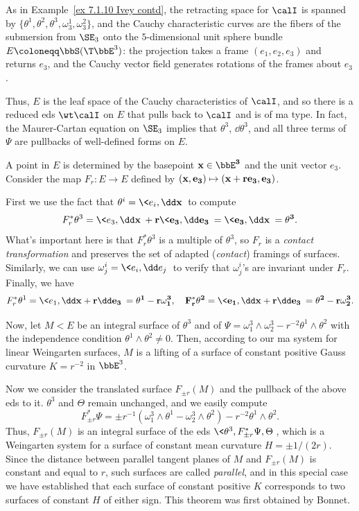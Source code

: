As in Example~\ref{ex 7.1.10 Ivey contd}, the retracting space for $\calI$ is spanned by $\{\theta^1,\theta^2,\theta^3,\omega_3^1,\omega_3^2\}$, and the Cauchy characteristic curves are the fibers of the submersion from $\SE_3$ onto the $5$-dimensional unit sphere bundle $E\coloneqq \bbS(\T\bbE^3)$: the projection takes a frame $(e_1,e_2,e_3)$ and returns $e_3$, and the Cauchy vector field generates rotations of the frames about $e_3$.

Thus, $E$ is the leaf space of the Cauchy characteristics of $\calI$, and so there is a reduced \gls{eds} $\wt\calI$ on $E$ that pulls back to $\calI$ and is of \gls{ma} type. In fact, the Maurer-Cartan equation on $\SE_3$ implies that $\theta^3$, $\dd\theta^3$, and all three terms of $\Psi$ are pullbacks of well-defined forms on $E$.

\begin{example}\label{xca 7.4.15 Ivey}
    A point in $E$ is determined by the basepoint $\bf{x}\in\bbE^3$ and the unit vector $e_3$. Consider the map $F_r:E\to E$ defined by $(\bf{x},e_3)\mapsto (\bf{x}+re_3,e_3)$.

    First we use the fact that $\theta^i=\<e_i,\dd \bf{x}\>$ to compute 
    \[F_r^\ast\theta^3=\<e_3,\dd \bf{x}\>+r\<e_3,\dd e_3\>=\<e_3,\dd\bf{x}\>=\theta^3.\]
    What's important here is that $F_r^\ast\theta^3$ is a multiple of $\theta^3$, so $F_r$ is a \emph{contact transformation} and preserves the set of adapted (\emph{contact}) framings of surfaces. Similarly, we can use $\omega^i_j=\<e_i,\dd e_j\>$ to verify that $\omega^i_j$'s are invariant under $F_r$. Finally, we have 
    \[F_r^\ast\theta^1=\<e_1,\dd\bf{x}+r\dd e_3\>=\theta^1-r\omega^3_1,\quad F_r^\ast\theta^2=\<e_1,\dd\bf{x}+r\dd e_3\>=\theta^2-r\omega^3_2.\]

    Now, let $M< E$ be an integral surface of $\theta^3$ and of $\Psi=\omega_1^3\wedge\omega_2^3-r^{-2}\theta^1\wedge\theta^2$ with the independence condition $\theta^1\wedge\theta^2\neq 0$. Then, according to our \gls{ma} system for linear Weingarten surfaces, $M$ is a lifting of a surface of constant positive Gauss curvature $K=r^{-2}$ in $\bbE^3$.

    Now we consider the translated surface $F_{\pm r}(M)$ and the pullback of the above \gls{eds} to it. $\theta^3$ and $\Theta$ remain unchanged, and we easily compute 
    \[F_{\pm r}^\ast \Psi=\pm r^{-1}(\omega^3_1\wedge\theta^1-\omega^3_2\wedge\theta^2)-r^{-2}\theta^1\wedge\theta^2.\]
    Thus, $F_{\pm r}(M)$ is an integral surface of the \gls{eds} $ \<\theta^3,F_{\pm r}^\ast\Psi,\Theta\>$, which is a Weingarten system for a surface of constant mean curvature $H=\pm 1/(2r)$. Since the distance between parallel tangent planes of $M$ and $F_{\pm r}(M)$ is constant and equal to $r$, such surfaces are called \emph{parallel}, and in this special case we have established that each surface of constant positive $K$ corresponds to two surfaces of constant $H$ of either sign. This theorem was first obtained by Bonnet.
\end{example}


